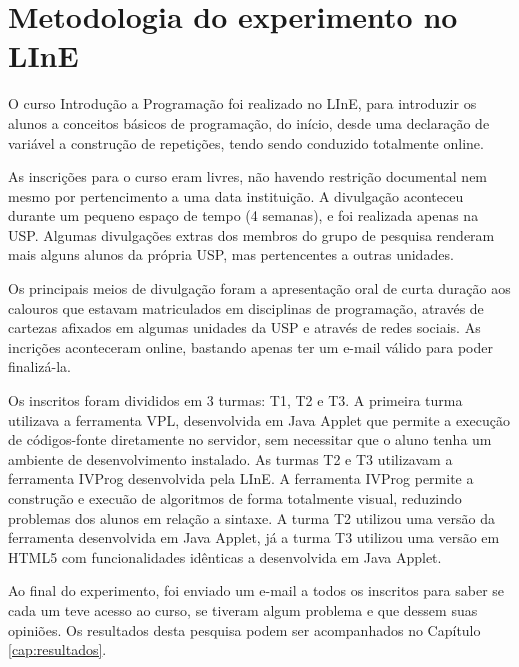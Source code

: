 \section{Metodologia do experimento no LInE}
\label{sec:metodologia_line}

O curso Introdução a Programação foi realizado no LInE, para introduzir os alunos a conceitos básicos de programação, do início, desde uma declaração de variável a construção de repetições, tendo sendo conduzido totalmente online.

As inscrições para o curso eram livres, não havendo restrição documental nem mesmo por pertencimento a uma data instituição. A divulgação aconteceu durante um pequeno espaço de tempo (4 semanas), e foi realizada apenas na USP. Algumas divulgações extras dos membros do grupo de pesquisa renderam mais alguns alunos da própria USP, mas pertencentes a outras unidades.

Os principais meios de divulgação foram a apresentação oral de curta duração aos calouros que estavam matriculados em disciplinas de programação, através de cartezas afixados em algumas unidades da USP e através de redes sociais. As incrições aconteceram online, bastando apenas ter um e-mail válido para poder finalizá-la.

Os inscritos foram divididos em 3 turmas: T1, T2 e T3. A primeira turma utilizava a ferramenta VPL, desenvolvida em Java Applet que permite a execução de códigos-fonte diretamente no servidor, sem necessitar que o aluno tenha um ambiente de desenvolvimento instalado. As turmas T2 e T3 utilizavam a ferramenta IVProg desenvolvida pela LInE. A ferramenta IVProg permite a construção e execuão de algoritmos de forma totalmente visual, reduzindo problemas dos alunos em relação a sintaxe. A turma T2 utilizou uma versão da ferramenta desenvolvida em Java Applet, já a turma T3 utilizou uma versão em HTML5 com funcionalidades idênticas a desenvolvida em Java Applet.

Ao final do experimento, foi enviado um e-mail a todos os inscritos para saber se cada um teve acesso ao curso, se tiveram algum problema e que dessem suas opiniões. Os resultados desta pesquisa podem ser acompanhados no Capítulo \ref{cap:resultados}.



